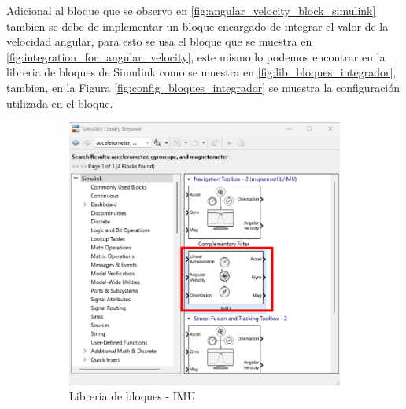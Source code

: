 Adicional al bloque que se observo en \ref{fig:angular_velocity_block_simulink} tambien se debe de implementar un bloque encargado de integrar el valor de la velocidad angular, para esto se usa el bloque que se muestra en \ref{fig:integration_for_angular_velocity}, este mismo lo podemos encontrar en la libreria de bloques de Simulink como se muestra en \ref{fig:lib_bloques_integrador}, tambien, en la Figura \ref{fig:config_bloques_integrador} se muestra la configuración utilizada en el bloque.

\begin{figure}[htbp]
    \centering
    \begin{subfigure}[b]{0.35\textwidth}
        \centering
        \includegraphics[width=\textwidth]{fig/Capitulo5/Caso_de_estudio_IMU/Generador_de_archivos/libreria_de_bloques_IMU.pdf}
        \caption{Librería de bloques - IMU}
        \label{fig:lib_bloques_IMU}
    \end{subfigure}
    \hfill
    \begin{subfigure}[b]{0.45\textwidth}
        \centering

\end{subfigure}
\end{figure}
